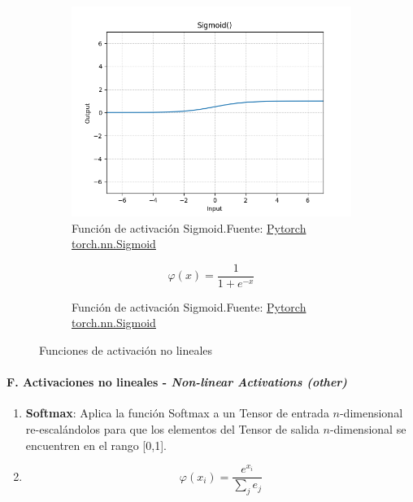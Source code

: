 \begin{figure}[H]
    \medskip
    \begin{subfigure}{.475\linewidth}
        \centering
        \includegraphics[width=0.75\linewidth]{figures/equations/Sigmoid.png}
        \caption{Función de activación Sigmoid.\newline{}Fuente: \href{https://pytorch.org/docs/stable/generated/torch.nn.Sigmoid.html}{Pytorch torch.nn.Sigmoid}}
        \label{subfig:torch.nn.Sigmoid}
    \end{subfigure}\hfill
    \begin{subfigure}{.475\linewidth}
        \centering
        \begin{equation*} \varphi(x) = \frac{1}{1+e^{-x}} \end{equation*}
        \caption{Función de activación Sigmoid.\newline{}Fuente: \href{https://pytorch.org/docs/stable/generated/torch.nn.Sigmoid.html}{Pytorch torch.nn.Sigmoid}}
        \label{subfig:eq-torch.nn.Sigmoid}
    \end{subfigure}

    \caption{Funciones de activación no lineales}
    \label{fig:p2--equations--Non-linear-Activations}
\end{figure}


\paragraph*{F. Activaciones no lineales - \textit{Non-linear Activations (other)} \cite{pytorch2024github}}

\begin{enumerate}
    \item \textbf{Softmax}: Aplica la función Softmax a un Tensor de entrada $n$-dimensional re-escalándolos para que los elementos del Tensor de salida $n$-dimensional se encuentren en el rango [0,1]. \cite{pytorch2024github}
    \item[] \begin{equation} \varphi(x_{i}) = \frac{e^{x_{i}}}{\sum_{j}{e_{j}}} \end{equation}
\end{enumerate}


